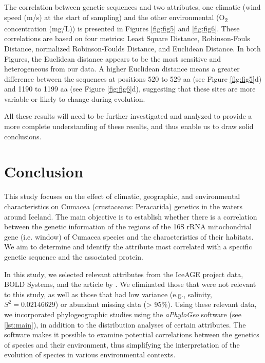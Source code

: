 The correlation between genetic sequences and two attributes, one climatic (wind speed (m/s) at the start of sampling) and the other environmental (O\textsubscript{2} concentration (mg/L)) is presented in Figures  \ref{fig:fig5} and  \ref{fig:fig6}. These correlations are based on four metrics: Least Square Distance, Robinson-Fouls Distance, normalized Robinson-Foulds Distance, and Euclidean Distance. In both Figures, the Euclidean distance appears to be the most sensitive and heterogeneous from our data. A higher Euclidean distance means a greater difference between the sequences at positions 520 to 529 aa (see Figure \ref{fig:fig5}d) and 1190 to 1199 aa (see Figure \ref{fig:fig6}d), suggesting that these sites are more variable or likely to change during evolution.

All these results will need to be further investigated and analyzed to provide a more complete understanding of these results, and thus enable us to draw solid conclusions.

\section{Conclusion}\label{conclusion}

This study focuses on the effect of climatic, geographic, and environmental characteristics on Cumacea (crustaceans: Peracarida) genetics in the waters around Iceland. The main objective is to establish whether there is a correlation between the genetic information of the regions of the 16S rRNA mitochondrial gene (i.e. window) of Cumacea species and the characteristics of their habitats. We aim to determine and identify the attribute most correlated with a specific genetic sequence and the associated protein. 

In this study, we selected relevant attributes from the IceAGE project data, BOLD Systems, and the article by \citep{uhlir_adding_2021}. We eliminated those that were not relevant to this study, as well as those that had low variance (e.g., salinity, $S^2 = 0.02146629$) or abundant missing data (> 95\%). Using these relevant data, we incorporated phylogeographic studies using the \textit{aPhyloGeo} software (see \autoref{lst:main}), in addition to the distribution analyses of certain attributes. The software makes it possible to examine potential correlations between the genetics of species and their environment, thus simplifying the interpretation of the evolution of species in various environmental contexts.

